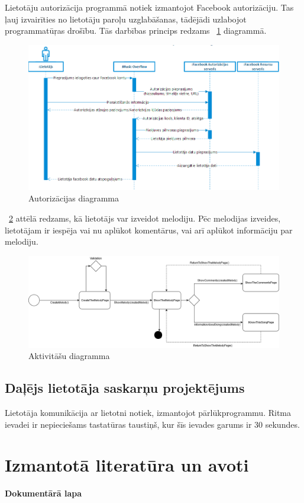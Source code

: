 \documentclass[12pt]{article}
\begin{document}
Lietotāju autorizācija programmā notiek izmantojot Facebook autorizāciju. Tas ļauj izvairīties no lietotāju paroļu uzglabāšanas, tādējādi uzlabojot programmatūŗas drošību. Tās darbības princips redzams ~\ref{fig:oauth_flow} diagrammā.

\begin{figure}[H]
\begin{center}
	\includegraphics[scale=0.6]{Oauth_flow.png}
	\caption{Autorizācijas diagramma}
	\label{fig:oauth_flow}
\end{center}
\end{figure}

~\ref{fig:activity_diagram} attēlā redzams, kā lietotājs var izveidot melodiju. Pēc melodijas izveides, lietotājam ir iespēja vai nu aplūkot komentārus, vai arī aplūkot informāciju par melodiju.

\begin{figure}[H]
\begin{center}
	\includegraphics[width=\linewidth,scale=0.5]{ActivityDiagram.png}
	\caption{Aktivitāšu diagramma}
	\label{fig:activity_diagram}
\end{center}
\end{figure}

\subsection{Daļējs lietotāja saskarņu projektējums}

Lietotāja komunikācija ar lietotni notiek, izmantojot pārlūkprogrammu. Ritma ievadei ir nepieciešams tastatūras taustiņš, kur šīs ievades garums ir 30 sekundes.

\pagebreak

\section*{Izmantotā literatūra un avoti}

\pagebreak

\textbf{\large Dokumentārā lapa}
\end{document}
